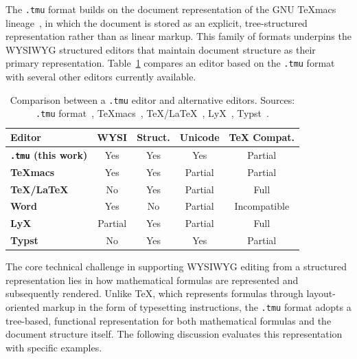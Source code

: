 The \texttt{.tmu} format builds on the document representation of the GNU \TeX{}macs lineage~\cite{van_der_hoeven_gnu_2001, moganstem2025, liiistem2025}, in which the document is stored as an explicit, tree-structured representation rather than as linear markup. This family of formats underpins the WYSIWYG structured editors that maintain document structure as their primary representation. Table~\ref{tab:mogan-vs-other} compares an editor based on the \texttt{.tmu} format with several other editors currently available.

\begin{table}[htbp]
    \centering
    \small
    \setlength{\tabcolsep}{3pt}
    \caption{
        Comparison between a \texttt{.tmu} editor and alternative editors.
        Sources: \texttt{.tmu} format~\cite{moganstem2025},
        \TeX{}macs~\cite{van_der_hoeven_gnu_2001},
        \TeX/\LaTeX~\cite{lamport1994document},
        LyX~\cite{jackson2001lyx},
        Typst~\cite{madje2023typst}.
    }
    \label{tab:mogan-vs-other}
    \begin{tabular}{p{1.9cm}cccc}
        \toprule
        \textbf{Editor}
        & \textbf{WYSI}
        & \textbf{Struct.}
        & \textbf{Unicode}
        & \textbf{\TeX{} Compat.} \\
        \midrule
        \textbf{\texttt{.tmu} (this work)} & Yes              & Yes                 & Yes                      & Partial                       \\
        \textbf{\TeX{}macs}    & Yes              & Yes                 & Partial                  & Partial                       \\
        \textbf{TeX/LaTeX}  & No               & Yes                 & Partial                  & Full                          \\
        \textbf{Word}       & Yes              & No                  & Partial                  & Incompatible                  \\
        \textbf{LyX}        & Partial          & Yes                 & Partial                  & Full                          \\
        \textbf{Typst}      & No               & Yes                 & Yes                      & Partial                       \\
        \bottomrule
    \end{tabular}
\end{table}

The core technical challenge in supporting WYSIWYG editing from a structured representation lies in how mathematical formulas are represented and subsequently rendered. Unlike \TeX{}, which represents formulas through layout-oriented markup in the form of typesetting instructions, the \texttt{.tmu} format adopts a tree-based, functional representation for both mathematical formulas and the document structure itself. The following discussion evaluates this representation with specific examples.

